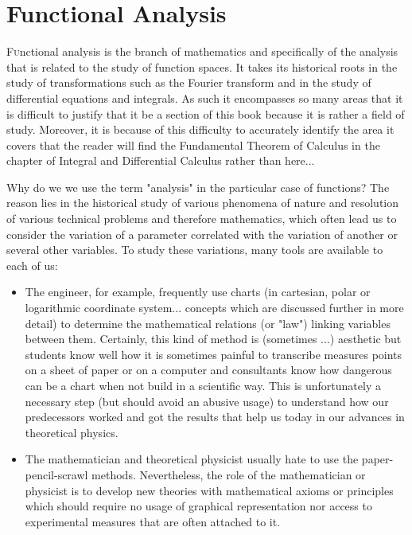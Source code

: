 	\newpage
	\thispagestyle{empty}
	\mbox{}
	\section{Functional Analysis}\label{functional analysis}
\lettrine[lines=4]{\color{BrickRed}F}unctional analysis is the branch of mathematics and specifically of the analysis that is related to the study of function spaces. It takes its historical roots in the study of transformations such as the Fourier transform and in the study of differential equations and integrals. As such it encompasses so many areas that it is difficult to justify that it be a section of this book because it is rather a field of study. Moreover, it is because of this difficulty to accurately identify the area it covers that the reader will find the Fundamental Theorem of Calculus in the chapter of Integral and Differential Calculus rather than here...

Why do we we use the term "analysis" in the particular case of functions? The reason lies in the historical study of various phenomena of nature and resolution of various technical problems and therefore mathematics, which often lead us to consider the variation of a parameter correlated with the variation of another or several other variables. To study these variations, many tools are available to each of us:

\begin{itemize}
	\item The engineer, for example, frequently use charts (in cartesian, polar or logarithmic coordinate system... concepts which are discussed further in more detail) to determine the mathematical relations (or "law") linking variables between them. Certainly, this kind of method is (sometimes ...) aesthetic but students know well how it is sometimes painful to transcribe measures points on a sheet of paper or on a computer and consultants know how dangerous can be a chart when not build in a scientific way. This is unfortunately a necessary step (but should avoid an abusive usage) to understand how our predecessors worked and got the results that help us today in our advances in theoretical physics.
	\item The mathematician and theoretical physicist usually hate to use the paper-pencil-scrawl methods. Nevertheless, the role of the mathematician or physicist is to develop new theories with mathematical axioms or principles which should require no usage of graphical representation nor access to experimental  measures that are often attached to it.
\end{itemize}

